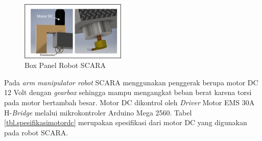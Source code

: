 \begin{figure}[H]
	\centering
	\includegraphics[width=5cm]{gambar/potsementara.jpg}
	\caption{Box Panel Robot SCARA}
	\label{pic.boxpanel}
\end{figure}

Pada \textit{arm manipulator robot} SCARA menggunakan penggerak berupa motor DC 12 Volt dengan \textit{gearbox} sehingga mampu mengangkat beban berat karena torsi pada motor bertambah besar. Motor DC dikontrol oleh \textit{Driver} Motor EMS 30A H-\textit{Bridge} melalui mikrokontroler Arduino Mega 2560. Tabel \ref{tbl.spesifikasimotordc} merupakan spesifikasi dari motor DC yang digunakan pada robot SCARA. 

